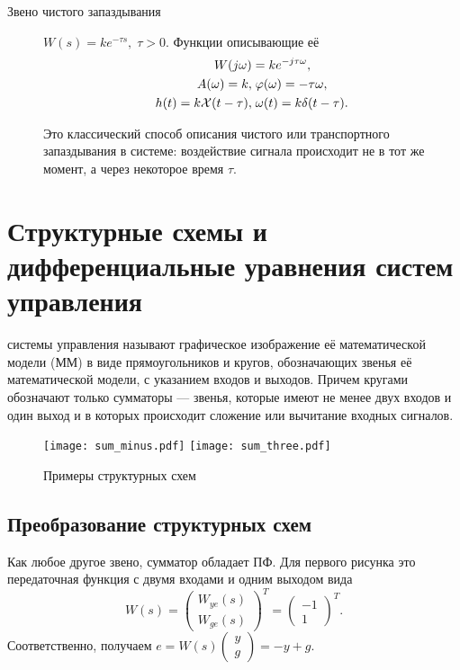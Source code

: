 \documentclass[../../TAU.tex]{subfiles}
\begin{document}
\begin{description}
    \item[Звено чистого запаздывания]
        ${W(s) = ke^{-\tau s},\; \tau > 0}$. Функции описывающие её
        $$
            \begin{aligned}
                W(j\omega) &= ke^{-j\tau\omega},\\
                A(\omega) = k,&\; \varphi(\omega) = -\tau\omega,\\
                h(t) = k\mathcal{X}(t-\tau),&\; \omega(t) = k\delta(t-\tau).
            \end{aligned}
        $$

        Это классический способ описания чистого или транспортного запаздывания в системе: воздействие сигнала происходит не в тот же момент, а через некоторое время $\tau$.
\end{description}

\section{Структурные схемы и дифференциальные уравнения систем управления}

     системы управления называют графическое изображение её математической модели (ММ) в виде прямоугольников и кругов, обозначающих звенья её математической модели, с указанием входов и выходов. Причем кругами обозначают только сумматоры --- звенья, которые имеют не менее двух входов и один выход и в которых происходит сложение или вычитание входных сигналов.

    \begin{figure}[h]
        \centering
        \texttt{[image: sum\_minus.pdf]}
        \texttt{[image: sum\_three.pdf]}
        \caption{Примеры структурных схем}
        \centering
    \end{figure}

\subsection{Преобразование структурных схем}

    Как любое другое звено, сумматор обладает ПФ. Для первого рисунка это передаточная функция с двумя входами и одним выходом вида
    $$
        W(s) =
        \begin{pmatrix}
            W_{ye}(s)\\
            W_{ge}(s)
        \end{pmatrix}^T =
        \begin{pmatrix}
            -1\\
            1
        \end{pmatrix}^T.
    $$
    Соответственно, получаем 
    ${e = W(s)\begin{pmatrix}y\\g\end{pmatrix} = -y+g}$.
\end{document}
